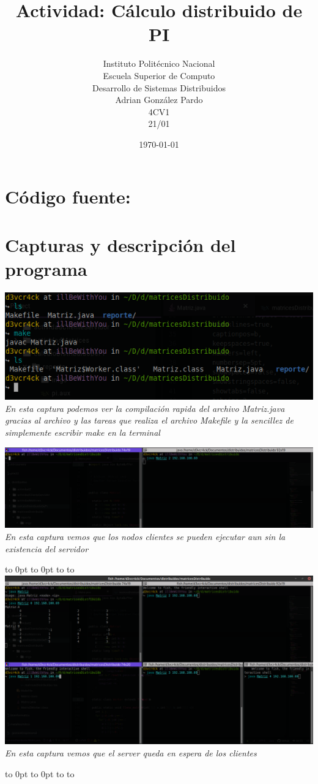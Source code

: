\documentclass[10pt,executivepaper]{article}
\title{Actividad: Cálculo distribuido de PI}
\author{Instituto Politécnico Nacional\\Escuela Superior de Computo\\Desarrollo de Sistemas Distribuidos\\Adrian González Pardo\\4CV1\\21/01}
\date{\today}
\def\fillandplacepagenumber{%
 \par\pagestyle{empty}%
 \vbox to 0pt{\vss}\vfill
 \vbox to 0pt{\baselineskip0pt
   \hbox to\linewidth{\hss}%
   \baselineskip\footskip
   \hbox to\linewidth{%
     \hfil\thepage\hfil}\vss}}
\begin{document}
\maketitle
\section{Código fuente:}
\begin{center}
  
  
\end{center}
\section{Capturas y descripción del programa}
\begin{center}
  \includegraphics[scale=0.5]{imgs/compilacion.png}
  \\\textit{En esta captura podemos ver la compilación rapida del archivo Matriz.java gracias al archivo y las tareas que realiza el archivo Makefile y la sencillez de simplemente escribir make en la terminal}

  \begin{landscape}
    \includegraphics[scale=0.5]{imgs/terminal-sin-server.png}
    \\\textit{En esta captura vemos que los nodos clientes se pueden ejecutar aun sin la existencia del servidor}
    \fillandplacepagenumber
    \includegraphics[scale=0.45]{imgs/terminal-1.png}
    \\\textit{En esta captura vemos que el server queda en espera de los clientes}
    \fillandplacepagenumber


\end{landscape}
\end{center}
\end{document}
